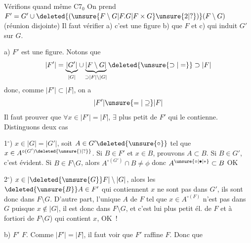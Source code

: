 Vérifions quand même C7$_0$
On prend $F'=G'\cup\deleted{(\unsure{F\setminus G|F.G|F\times G}\unsure{2|?})}(F\setminus G)$ (réunion disjointe)
Il faut vérifier a) c'est une figure b) que  $F$ et c) qui induit $G'$ sur $G$.

a) $F'$ est une figure.  Notons que 
\[
 |F'|=\underbrace{|G'|}_{|G|}\cup\underbrace{|F\setminus G|}_{\supset |F|\setminus |G|}\deleted{\unsure{\supset|=}}\supset |F|
\]
donc, comme $|F'|\subset |F|$, on a
\[
 |F'|\unsure{=|\supseteq}|F|
\]
Il faut prouver que $\forall x\in |F'|=|F|$, $\exists$ plus petit  de $F'$ qui le contienne. Distinguons deux cas

1$^\circ$) $x\in |G|=|G'|$, soit $A\in G'\deleted{\unsure{\circ}}$ tel que $x\in A^{\circ(G')\deleted{\unsure{)|?}}}$. Si $B\in F'$ et  $x\in B$, prouvons $A\subset B$. Si $B\in G'$, c'est évident. Si $B\in F\setminus G$, alors  $A^{\circ(G')}\cap B\ne\phi$ donc $A^{\unsure{\circ|\bullet|*}}\subset B$ OK

2$^\circ$) $x\in |\deleted{\unsure{G}}F|\setminus |G|$, alors les $\deleted{\unsure{B}}A\in F'$ qui contiennent $x$ ne sont pas dans $G'$, ils sont donc dans $F\setminus G$. D'autre part, l'unique  $A$ de $F$ tel que $x\in A^{\circ(F)}$ n'est pas dans $G$ puisque $x\notin |G|$, il est donc dans $F\setminus G$, et  c'est lui plus petit él. de $F$ et à fortiori de $F\setminus G$) qui contient $x$, OK~!

b) $F'$  $F$. Comme $|F'|=|F|$, il faut voir  que $F'$ raffine $F$. Donc  que

